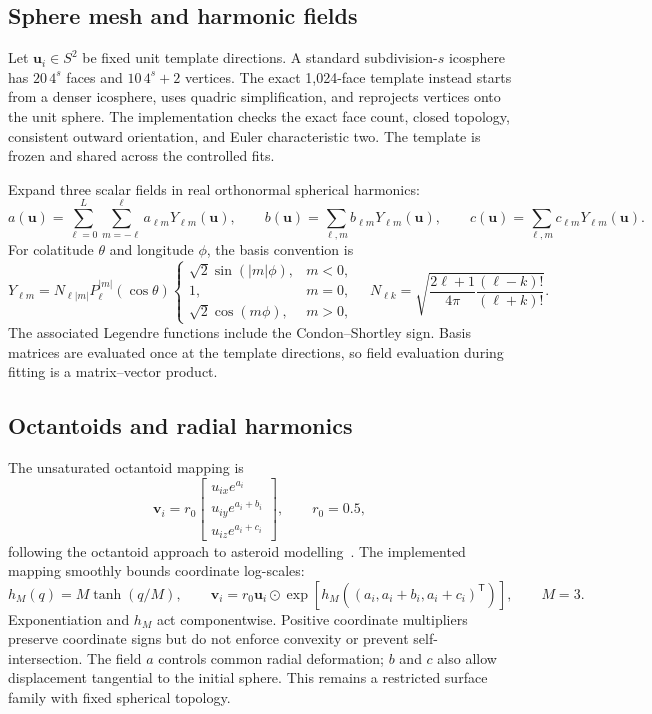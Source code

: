 \documentclass[10pt,a4paper]{article}
\newcommand{\vect}[1]{\bm{#1}}
\begin{document}
\subsection{Sphere mesh and harmonic fields}
Let $\vect u_i\in S^2$ be fixed unit template directions. A standard
subdivision-$s$ icosphere has $20\,4^s$ faces and $10\,4^s+2$ vertices.
The exact 1,024-face template instead starts from a denser icosphere,
uses quadric simplification, and reprojects vertices onto the unit sphere.
The implementation checks the exact face count, closed topology,
consistent outward orientation, and Euler characteristic two. The
template is frozen and shared across the controlled fits.

Expand three scalar fields in real orthonormal spherical harmonics:
\begin{equation}
 a(\vect u)=\sum_{\ell=0}^{L}\sum_{m=-\ell}^{\ell}a_{\ell m}Y_{\ell m}(\vect u),
 \qquad b(\vect u)=\sum_{\ell,m}b_{\ell m}Y_{\ell m}(\vect u),
 \qquad c(\vect u)=\sum_{\ell,m}c_{\ell m}Y_{\ell m}(\vect u).
\end{equation}
For colatitude $\theta$ and longitude $\phi$, the basis convention is
\begin{equation}
 Y_{\ell m}=N_{\ell |m|}P_\ell^{|m|}(\cos\theta)
 \begin{cases}
 \sqrt{2}\sin(|m|\phi),&m<0,\\
 1,&m=0,\\
 \sqrt{2}\cos(m\phi),&m>0,
 \end{cases}
 \quad N_{\ell k}=\sqrt{\frac{2\ell+1}{4\pi}\frac{(\ell-k)!}{(\ell+k)!}}.
\end{equation}
The associated Legendre functions include the Condon--Shortley sign.
Basis matrices are evaluated once at the template directions, so field
evaluation during fitting is a matrix--vector product.

\subsection{Octantoids and radial harmonics}
The unsaturated octantoid mapping is
\begin{equation}
 \vect v_i=r_0\begin{bmatrix}
 u_{ix}e^{a_i}\\u_{iy}e^{a_i+b_i}\\u_{iz}e^{a_i+c_i}
 \end{bmatrix},\qquad r_0=0.5,
 \label{eq:octantoid}
\end{equation}
following the octantoid approach to asteroid modelling~\cite{octantoid,adam}.
The implemented mapping smoothly bounds coordinate log-scales:
\begin{equation}
 h_M(q)=M\tanh(q/M),\qquad
 \vect v_i=r_0\vect u_i\odot
 \exp\!\left[h_M\!\left((a_i,a_i+b_i,a_i+c_i)^\mathsf T\right)\right],
 \qquad M=3.
 \label{eq:saturation}
\end{equation}
Exponentiation and $h_M$ act componentwise. Positive coordinate multipliers
preserve coordinate signs but do not enforce convexity or prevent
self-intersection. The field $a$ controls common radial deformation;
$b$ and $c$ also allow displacement tangential to the initial sphere.
This remains a restricted surface family with fixed spherical topology.
\end{document}

